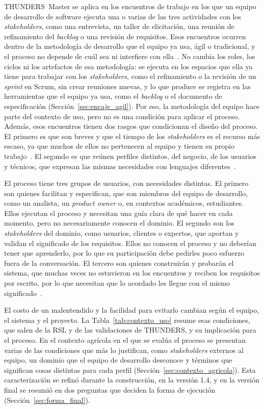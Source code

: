 \documentclass[12pt,letterpaper,oneside]{report}
\begin{document}
THUNDERS~Master se aplica en los encuentros de trabajo en los que un equipo de
desarrollo de software ejecuta una o varias de las tres actividades con los
\textit{stakeholders}, como una entrevista, un taller de elicitación, una
reunión de refinamiento del \textit{backlog} o una revisión de requisitos. Esos
encuentros ocurren dentro de la metodología de desarrollo que el equipo ya usa,
ágil o tradicional, y el proceso no depende de cuál sea ni interfiere con
ella~\cite{kasauli2021}. No cambia los roles, los ciclos ni los artefactos de
esa metodología: se ejecuta en los espacios que ella ya tiene para trabajar con
los \textit{stakeholders}, como el refinamiento o la revisión de un
\textit{sprint} en Scrum, sin crear reuniones nuevas, y lo que produce se
registra en las herramientas que el equipo ya usa, como el \textit{backlog} o
el documento de especificación (Sección~\ref{sec:encaje_agil}). Por eso, la
metodología del equipo hace parte del contexto de uso, pero no es una condición
para aplicar el proceso. Además, esos encuentros tienen dos rasgos que
condicionan el diseño del proceso. El primero es que son breves y que el tiempo
de los \textit{stakeholders} es el recurso más escaso, ya que muchos de ellos no
pertenecen al equipo y tienen su propio trabajo~\cite{khan2022stakeholders}. El
segundo es que reúnen perfiles distintos, del negocio, de los usuarios y
técnicos, que expresan las mismas necesidades con lenguajes
diferentes~\cite{balasubramaniam2023,irshad2021bdd}.

El proceso tiene tres grupos de usuarios, con necesidades distintas. El primero
son quienes facilitan y especifican, que son miembros del equipo de desarrollo,
como un analista, un \textit{product owner} o, en contextos académicos,
estudiantes. Ellos ejecutan el proceso y necesitan una guía clara de qué hacer
en cada momento, pero no necesariamente conocen el dominio. El segundo son los
\textit{stakeholders} del dominio, como usuarios, clientes o expertos, que
aportan y validan el significado de los requisitos. Ellos no conocen el proceso
y no deberían tener que aprenderlo, por lo que su participación debe pedirles
poco esfuerzo fuera de la conversación. El tercero son quienes construirán y
probarán el sistema, que muchas veces no estuvieron en los encuentros y reciben
los requisitos por escrito, por lo que necesitan que lo acordado les llegue con
el mismo significado~\cite{fricker2015}.

El costo de un malentendido y la facilidad para evitarlo cambian según el
equipo, el sistema y el proyecto. La Tabla~\ref{tab:contexto_uso} resume esas
condiciones, que salen de la RSL y de las validaciones de THUNDERS, y su
implicación para el proceso. En el contexto agrícola en el que se evalúa el
proceso se presentan varias de las condiciones que más lo justifican, como
\textit{stakeholders} externos al equipo, un dominio que el equipo de desarrollo
desconoce y términos que significan cosas distintas para cada perfil
(Sección~\ref{sec:contexto_agricola}). Esta caracterización se refinó durante la
construcción, en la versión 1.4, y en la versión final se resumió en dos
preguntas que deciden la forma de ejecución (Sección~\ref{sec:forma_final}).
\end{document}
